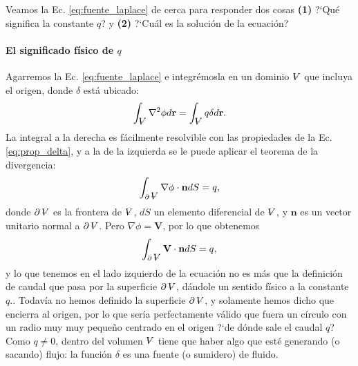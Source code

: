 Veamos la Ec. \eqref{eq:fuente_laplace} de cerca para responder dos cosas {\bf(1)} \mbox{?`}Qué significa la constante $q$? y {\bf(2)} \mbox{?`}Cuál es la solución de la ecuación?

\paragraph{El significado físico de $q$}
Agarremos la Ec. \eqref{eq:fuente_laplace} e integrémosla en un dominio $\vol$ que incluya el origen, donde $\delta$ está ubicado:
%
\begin{equation}
\int_{\vol}\nabla^2\phi d\mathbf{r}= \int_{\vol}q\delta d\mathbf{r}. 
\end{equation}
%
La integral a la derecha es fácilmente resolvible con las propiedades de la Ec. \eqref{eq:prop_delta}, y a la de la izquierda se le puede aplicar el teorema de la divergencia:
%
\begin{equation}\label{eq:fuente_int}
\int_{\partial\vol}\nabla\phi\cdot\mathbf{n}dS = q,
\end{equation}
%
donde $\partial\vol$ es la frontera de $\vol$, $dS$ un elemento diferencial de $\vol$, y $\mathbf{n}$ es un vector unitario normal a $\partial\vol$.
Pero $\nabla\phi=\mathbf{V}$, por lo que obtenemos
%
\begin{equation}
\int_{\partial\vol}\mathbf{V}\cdot\mathbf{n}dS = q,
\end{equation}
%
y lo que tenemos en el lado izquierdo de la ecuación no es más que la definición de caudal que pasa por la superficie $\partial\vol$, dándole un sentido físico a la constante $q$..
Todavía no hemos definido la superficie $\partial\vol$, y solamente hemos dicho que encierra al origen, por lo que sería perfectamente válido que fuera un círculo con un radio muy muy pequeño centrado en el origen \mbox{?`}de dónde sale el caudal $q$?
Como $q\neq0$, dentro del volumen $\vol$ tiene que haber algo que esté generando (o sacando) flujo: la función $\delta$ es una fuente (o sumidero) de fluido.

